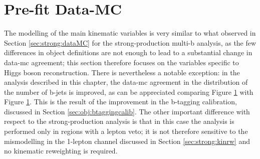 \begin{table}[h]
\caption{Validation region definitions in the high-mass analysis. The units of \met, \mtb, $m(h_1)$, $m(h_2)$, and \meffb are GeV. These variables are defined in Section~\ref{high_event_selection}.}
\begin{center}
\label{tab:VR}
\end{center}
\end{table}

\section{Pre-fit Data-MC}

The modelling of the main kinematic variables is very similar to what observed in Section \ref{sec:strong:dataMC} 
for the strong-production multi-b analysis, as the few differences in object definitions are not enough to 
lead to a substantial change in data-\gls{mc} agreement; 
this section therefore focuses on the variables specific to Higgs boson reconstruction.
There is nevertheless a notable exception: in the analysis described in this chapter, the data-\gls{mc} agreement in the 
distribution of the number of b-jets is improved, as can be appreciated comparing Figure \ref{} with Figure \ref{}.
This is the result of the improvement in the b-tagging calibration, discussed in Section \ref{sec:obj:btaggingcalib}.
The other important difference with respect to the strong-production analysis is that in this case the analysis is performed 
only in regions with a lepton veto; it is not therefore sensitive to the mismodelling in the 1-lepton channel discussed in Section 
\ref{sec:strong:kinrw} and no kinematic reweighting is required. 


